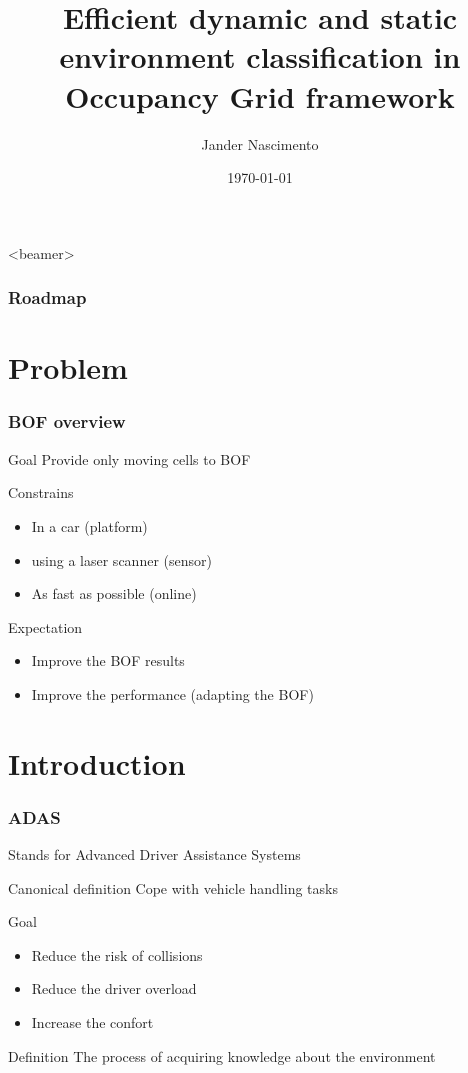 \documentclass{beamer}
\title[Fast classification]{Efficient dynamic and static environment classification in Occupancy Grid framework}
\author{Jander Nascimento}
\institute{Université Joseph Fourier / INRIA}
\date{\today}
\begin{document}
\begin{frame}
\titlepage
\end{frame}

{
  \begin{frame}<beamer>
    \frametitle{Roadmap}
    \tableofcontents%
  \end{frame}
}

\section{Problem}

	\begin{frame}
		\frametitle{BOF overview}
		\begin{block}{Goal}
			 Provide only moving cells to BOF
		\end{block}
		 
		Constrains
		\begin{itemize}
			\item In a car (platform)
			\item using a laser scanner (sensor)
			\item As fast as possible (online)
		\end{itemize}
		
		Expectation
		\begin{itemize}
			\item Improve the BOF results
			\item Improve the performance (adapting the BOF)
		\end{itemize}

	\end{frame}


\section{Introduction}

	\begin{frame}
		\frametitle{ADAS}
		\begin{exampleblock}{Stands for}	
			Advanced Driver Assistance Systems		
		\end{exampleblock}				
		\begin{block}{Canonical definition}
			Cope with vehicle handling tasks
		\end{block}		
		\begin{block}{Goal}
			\begin{itemize}
			\item Reduce the risk of collisions
			\item Reduce the driver overload
			\item Increase the confort
			\end{itemize}
		\end{block}
		\begin{block}{Definition}
				The process of acquiring knowledge about the environment \cite{iyengar1991autonomous}
		\end{block}
	\end{frame}
\end{document}
